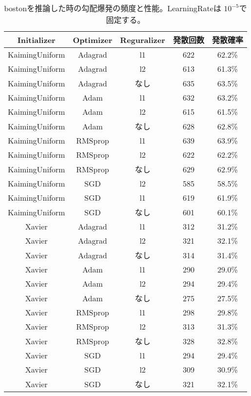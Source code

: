 \begin{table}[htbp]
    \begin{center}
        \caption{bostonを推論した時の勾配爆発の頻度と性能。LearningRateは $ 10^{-5} $で固定する。 }
        \label{appendix:errorcount_table}
        \vspace{2mm} 
        \begin{tabular}{ |c|c|c|c|c| }
        \hline
        Initializer & Optimizer &  Reguralizer & 発散回数 & 発散確率 \\
        \hline
        KaimingUniform & Adagrad & l1 & 622 & 62.2\% \\
        \hline
        KaimingUniform & Adagrad & l2 & 613 & 61.3\% \\
        \hline
        KaimingUniform & Adagrad & なし & 635 & 63.5\% \\
        \hline
        KaimingUniform & Adam & l1 & 632 & 63.2\% \\
        \hline
        KaimingUniform & Adam & l2 & 615 & 61.5\% \\
        \hline
        KaimingUniform & Adam & なし & 628 & 62.8\% \\
        \hline
        KaimingUniform & RMSprop & l1 & 639 & 63.9\% \\
        \hline
        KaimingUniform & RMSprop & l2 & 622 & 62.2\% \\
        \hline
        KaimingUniform & RMSprop & なし & 629 & 62.9\% \\
        \hline
        KaimingUniform & SGD & l2 & 585 & 58.5\% \\
        \hline
        KaimingUniform & SGD & l1 & 619 & 61.9\% \\
        \hline
        KaimingUniform & SGD & なし & 601 & 60.1\% \\
        \hline
        Xavier & Adagrad & l1 & 312 & 31.2\% \\
        \hline
        Xavier & Adagrad & l2 & 321 & 32.1\% \\
        \hline
        Xavier & Adagrad & なし & 314 & 31.4\% \\
        \hline
        Xavier & Adam & l1 & 290 & 29.0\% \\
        \hline
        Xavier & Adam & l2 & 294 & 29.4\% \\
        \hline
        Xavier & Adam & なし & 275 & 27.5\% \\
        \hline
        Xavier & RMSprop & l1 & 298 & 29.8\% \\
        \hline
        Xavier & RMSprop & l2 & 313 & 31.3\% \\
        \hline
        Xavier & RMSprop & なし & 328 & 32.8\% \\
        \hline
        Xavier & SGD & l1 & 294 & 29.4\% \\
        \hline
        Xavier & SGD & l2 & 309 & 30.9\% \\
        \hline
        Xavier & SGD & なし & 321 & 32.1\% \\
        \hline
        \end{tabular}
    \end{center}
\end{table}
